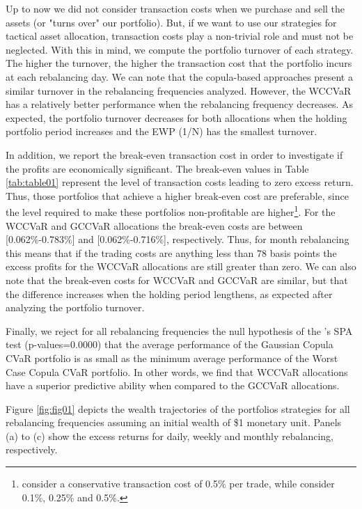 \documentclass[a4paper,10pt]{article}
\begin{document}
Up to now we did not consider transaction costs when we purchase and sell
the assets (or "turns over" our portfolio). But, if we want to use our
strategies for tactical asset allocation, transaction costs play a
non-trivial role and must not be neglected. With this in mind, we compute
the portfolio turnover of each strategy. The higher the turnover, the higher
the transaction cost that the portfolio incurs at each rebalancing day. We can note that the copula-based approaches present a similar turnover in the rebalancing frequencies analyzed. However, the WCCVaR has a relatively better performance when the rebalancing frequency decreases. As expected, the portfolio turnover decreases for both allocations
when the holding portfolio period increases and the EWP (1/N) has the
smallest turnover.

In addition, we report the break-even transaction cost in order to investigate
if the profits are economically significant. The break-even values in Table
\ref{tab:table01} represent the level of transaction
costs leading to zero excess return. Thus, those portfolios that achieve a
higher break-even cost are preferable, since the level required to make
these portfolios non-profitable are higher\footnote{\citet*{jega1993} consider a conservative transaction cost of 0.5\% per
	trade, while \citet*{allen1999} consider 0.1\%, 0.25\% and 0.5\%.}. For the
WCCVaR and GCCVaR allocations the break-even costs are between [0.062\%-0.783\%]
and [0.062\%-0.716\%], respectively. Thus, for month rebalancing this means
that if the trading costs are anything less than 78 basis points the excess
profits for the WCCVaR allocations are still greater than zero. We can also note
that the break-even costs for WCCVaR and GCCVaR are similar, but that the
difference increases when the holding period lengthens, as expected after analyzing the portfolio turnover. 

Finally, we reject for all rebalancing frequencies the null hypothesis of the \citet*{hansen2005test}'s SPA test (p-values=0.0000) that the average performance of the Gaussian Copula CVaR 
portfolio is as small as the minimum average
performance of the Worst Case Copula CVaR portfolio. In other words, we find that WCCVaR allocations have a superior predictive ability when compared to the GCCVaR allocations.


Figure \ref{fig:fig01} depicts the wealth trajectories of the portfolios strategies for all rebalancing frequencies assuming an initial wealth of \$1 monetary unit. Panels (a) to (c) show the excess returns for daily, weekly and monthly rebalancing, respectively.
\end{document}
